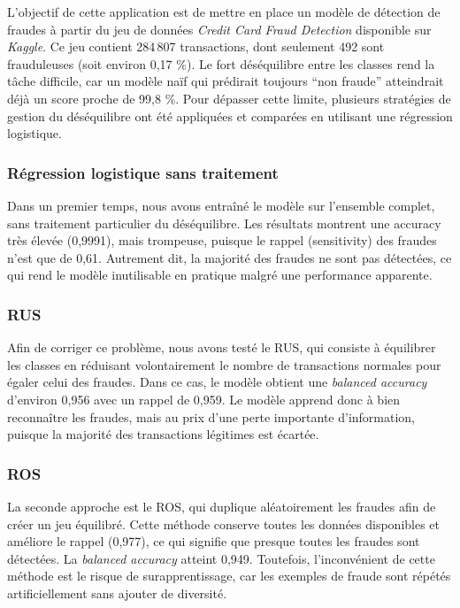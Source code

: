 \documentclass{article}
\begin{document}
L’objectif de cette application est de mettre en place un modèle de détection de fraudes à partir du jeu de données \textit{Credit Card Fraud Detection} disponible sur \textit{Kaggle}.
Ce jeu contient 284\,807 transactions, dont seulement 492 sont frauduleuses (soit environ 0,17 \%).
Le fort déséquilibre entre les classes rend la tâche difficile, car un modèle naïf qui prédirait toujours ``non fraude'' atteindrait déjà un score proche de 99,8 \%.
Pour dépasser cette limite, plusieurs stratégies de gestion du déséquilibre ont été appliquées et comparées en utilisant une régression logistique.

\subsubsection*{Régression logistique sans traitement}
Dans un premier temps, nous avons entraîné le modèle sur l’ensemble complet, sans traitement particulier du déséquilibre.
Les résultats montrent une accuracy très élevée (0,9991), mais trompeuse, puisque le rappel (sensitivity) des fraudes n’est que de 0,61.
Autrement dit, la majorité des fraudes ne sont pas détectées, ce qui rend le modèle inutilisable en pratique malgré une performance apparente.

\subsubsection*{RUS}
Afin de corriger ce problème, nous avons testé le RUS, qui consiste à équilibrer les classes en réduisant volontairement le nombre de transactions normales pour égaler celui des fraudes.
Dans ce cas, le modèle obtient une \textit{balanced accuracy} d’environ 0,956 avec un rappel de 0,959.
Le modèle apprend donc à bien reconnaître les fraudes, mais au prix d’une perte importante d’information, puisque la majorité des transactions légitimes est écartée.

\subsubsection*{ROS}
La seconde approche est le ROS, qui duplique aléatoirement les fraudes afin de créer un jeu équilibré.
Cette méthode conserve toutes les données disponibles et améliore le rappel (0,977), ce qui signifie que presque toutes les fraudes sont détectées.
La \textit{balanced accuracy} atteint 0,949.
Toutefois, l’inconvénient de cette méthode est le risque de surapprentissage, car les exemples de fraude sont répétés artificiellement sans ajouter de diversité.
\end{document}
